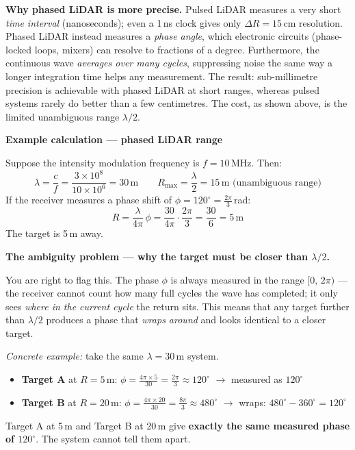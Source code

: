 \documentclass[12pt, a4paper]{article}
\begin{document}
\begin{notebox}
  \textbf{Why phased LiDAR is more precise.}
  Pulsed LiDAR measures a very short \emph{time interval} (nanoseconds);
  even a 1\,ns clock gives only $\Delta R = 15$\,cm resolution.
  Phased LiDAR instead measures a \emph{phase angle}, which electronic
  circuits (phase-locked loops, mixers) can resolve to fractions of a degree.
  Furthermore, the continuous wave \emph{averages over many cycles},
  suppressing noise the same way a longer integration time helps any
  measurement.  The result: sub-millimetre precision is achievable with
  phased LiDAR at short ranges, whereas pulsed systems rarely do better than
  a few centimetres.  The cost, as shown above, is the limited unambiguous
  range $\lambda/2$.
\end{notebox}

\begin{notebox}
  \textbf{Example calculation --- phased LiDAR range}

  Suppose the intensity modulation frequency is $f = 10$\,MHz.  Then:
  \[
    \lambda = \frac{c}{f} = \frac{3\times10^8}{10\times10^6} = 30\,\text{m}
    \qquad
    R_{\max} = \frac{\lambda}{2} = 15\,\text{m (unambiguous range)}
  \]
  If the receiver measures a phase shift of $\phi = 120^\circ = \tfrac{2\pi}{3}$\,rad:
  \[
    R = \frac{\lambda}{4\pi}\,\phi
      = \frac{30}{4\pi}\cdot\frac{2\pi}{3}
      = \frac{30}{6}
      = 5\,\text{m}
  \]
  The target is 5\,m away.

  \textbf{The ambiguity problem --- why the target must be closer than
  $\lambda/2$.}

  You are right to flag this.  The phase $\phi$ is always measured in the
  range $[0,\,2\pi)$ --- the receiver cannot count how many full cycles the
  wave has completed; it only sees \emph{where in the current cycle} the
  return sits.  This means that any target further than $\lambda/2$ produces
  a phase that \emph{wraps around} and looks identical to a closer target.

  \textit{Concrete example:} take the same $\lambda = 30$\,m system.
  \begin{itemize}[leftmargin=1.2em,itemsep=3pt]
    \item \textbf{Target A} at $R = 5$\,m:
      $\phi = \tfrac{4\pi \times 5}{30} = \tfrac{2\pi}{3} \approx 120^\circ$
      \quad$\to$ measured as $120^\circ$ \checkmark
    \item \textbf{Target B} at $R = 20$\,m:
      $\phi = \tfrac{4\pi \times 20}{30} = \tfrac{8\pi}{3} \approx 480^\circ$
      \quad$\to$ wraps: $480^\circ - 360^\circ = 120^\circ$
  \end{itemize}
  Target A at 5\,m and Target B at 20\,m give \textbf{exactly the same
  measured phase of $120^\circ$}.  The system cannot tell them apart.


\end{notebox}
\end{document}
